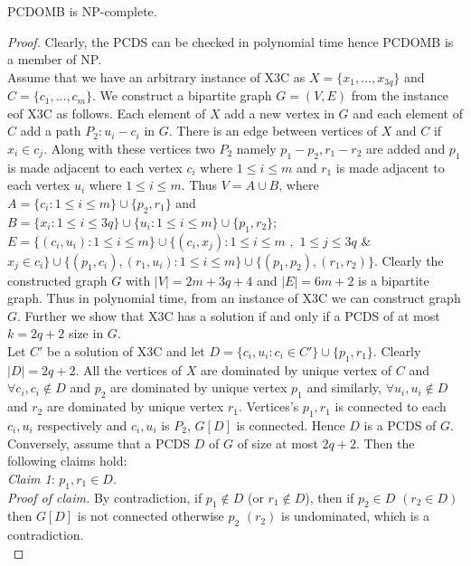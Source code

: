 \begin{theorem}
PCDOMB is NP-complete.
\begin{proof}
Clearly, the PCDS can be checked in polynomial time hence PCDOMB is a member of NP.\\
Assume that we have an arbitrary instance of X3C as $X=\lbrace x_1,\ldots ,x_{3q} \rbrace$ and $C=\lbrace c_1, \ldots,c_m \rbrace$. We construct a bipartite graph $G=(V,E)$ from the instance eof X3C as follows. Each element of $X$ add a new vertex in $G$ and each element of $C$ add a path $P_2:u_i-c_i$ in $G$. There is an edge between vertices of $X$ and $C$ if $x_i \in c_j$. Along with these vertices two $P_2$ namely $p_1-p_2, r_1-r_2$ are added and $p_1$ is made adjacent to each vertex $c_i$ where $1 \leq i \leq m$ and $r_1$ is made adjacent to each vertex $u_i$ where $1 \leq i \leq m$. Thus $V = A \cup B$, where $A=\lbrace c_i : 1 \leq i \leq m \rbrace \cup \lbrace p_2, r_1 \rbrace $ and $B=\lbrace x_i : 1 \leq i \leq 3q \rbrace \cup \lbrace u_i : 1 \leq i \leq m \rbrace \cup \lbrace p_1, r_2 \rbrace $; $E=\lbrace (c_i,u_i): 1\leq i \leq m \rbrace \cup \lbrace (c_i,x_j):1 \leq i \leq m$ $,$ $1 \leq j \leq 3q$ $\&$ $ x_j \in c_i \rbrace \cup \lbrace (p_1,c_i), (r_1,u_i): 1\leq i \leq m \rbrace \cup \lbrace (p_1,p_2),(r_1,r_2) \rbrace $. Clearly the constructed graph $G$ with $|V|=2m+3q+4$ and  $|E|=6m+2$ is a bipartite graph. Thus in polynomial time, from an instance of X3C we can construct graph $G$. Further we show that X3C has a solution if and only if a PCDS of at most $k=2q+2$ size in $G$.\\
Let $C'$ be a solution of X3C and let $D = \lbrace c_i,u_i : c_i \in C' \rbrace \cup \lbrace p_1,r_1 \rbrace$. Clearly $|D|=2q+2$. All the vertices of $X$ are dominated by unique vertex of $C$ and $\forall c_i, c_i \notin D$ and $p_2$ are dominated by unique vertex $p_1$ and similarly, $\forall u_i, u_i \notin D$ and $r_2$ are dominated by unique vertex $r_1$. Vertices's $p_1,r_1$ is connected to each $c_i,u_i$ respectively and $c_i,u_i$ is $P_2$, $G[D]$ is connected. Hence $D$ is a PCDS of $G$.\\ 
Conversely, assume that a PCDS $D$ of $G$ of size at most $2q+2$. Then the following claims hold:\\
{\textit{Claim 1}:} $p_1,r_1 \in D$.\\
\textit{Proof of claim.} By contradiction, if $p_1 \notin D$ (or $r_1 \notin D$), then if $p_2 \in D$ $(r_2 \in D)$ then $G[D]$ is not connected otherwise $p_2$ $(r_2)$ is undominated, which is a contradiction.\\

\end{proof}
\end{theorem}
